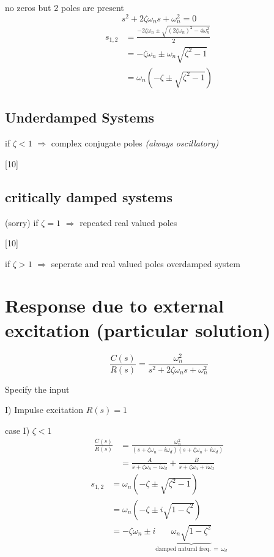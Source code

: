 \documentclass[11pt,a4paper]{article}
\begin{document}
no zeros but 2 poles are present
\[
s^2+2\zeta\omega_n s+\omega_n^2=0
\]
\begin{align*}
s_{1,2}&=\frac{-2\zeta\omega_n\pm\sqrt{(2\zeta\omega_n)^2-4\omega_n^2}}{2}\\
&=-\zeta\omega_n\pm\omega_n\sqrt{\zeta^2-1}\\
&=\omega_n\left(-\zeta\pm\sqrt{\zeta^2-1}\right)
\end{align*}

\subsection{Underdamped Systems}
if $\zeta<1$ $\Rightarrow$ complex conjugate poles \textit{(always oscillatory)}

[10]

\subsection{critically damped systems}
(sorry) if $\zeta=1$ $\Rightarrow$ repeated real valued poles

[10]

if $\zeta>1$ $\Rightarrow$ seperate and real valued poles \hfill overdamped system


\section{Response due to external excitation (particular solution)}
\[
\frac{C(s)}{R(s)}=\frac{\omega_n^2}{s^2+2\zeta\omega_n s+\omega_n^2}
\]

Specify the input

I) Impulse excitation \qquad $R(s)=1$

case I) $\zeta<1$
\begin{align*}
\frac{C(s)}{R(s)}&=\frac{\omega_n^2}{(s+\zeta\omega_n-i\omega_d)(s+\zeta\omega_n+i\omega_d)}\\
&=\frac{A}{s+\zeta\omega_n-i\omega_d}+\frac{B}{s+\zeta\omega_n+i\omega_d}
\end{align*}
\begin{align*}
s_{1,2}&=\omega_n\left(-\zeta\pm\sqrt{\zeta^2-1}\right)\\
&=\omega_n\left(-\zeta\pm i\sqrt{1-\zeta^2}\right)\\
&=-\zeta\omega_n\pm i\underbrace{\omega_n\sqrt{1-\zeta^2}}_{\text{damped natural freq.}\,=\,\omega_d}
\end{align*}
\end{document}
